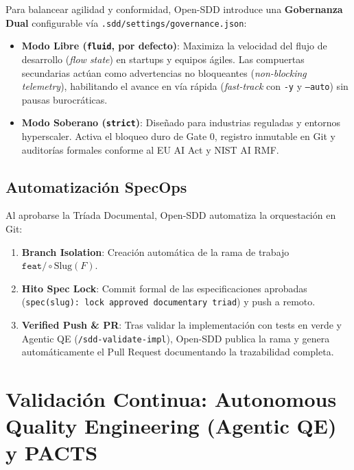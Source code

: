 \documentclass[11pt,a4paper]{article}
\begin{document}
Para balancear agilidad y conformidad, Open-SDD introduce una \textbf{Gobernanza Dual} configurable vía \texttt{.sdd/settings/governance.json}:
\begin{itemize}
    \item \textbf{Modo Libre (\texttt{fluid}, por defecto)}: Maximiza la velocidad del flujo de desarrollo (\textit{flow state}) en startups y equipos ágiles. Las compuertas secundarias actúan como advertencias no bloqueantes (\textit{non-blocking telemetry}), habilitando el avance en vía rápida (\textit{fast-track} con \texttt{-y} y \texttt{--auto}) sin pausas burocráticas.
    \item \textbf{Modo Soberano (\texttt{strict})}: Diseñado para industrias reguladas y entornos hyperscaler. Activa el bloqueo duro de Gate 0, registro inmutable en Git y auditorías formales conforme al EU AI Act y NIST AI RMF.
\end{itemize}

\subsection{Automatización SpecOps}
Al aprobarse la Tríada Documental, Open-SDD automatiza la orquestación en Git:
\begin{enumerate}
    \item \textbf{Branch Isolation}: Creación automática de la rama de trabajo $\texttt{feat/} \circ \text{Slug}(F)$.
    \item \textbf{Hito Spec Lock}: Commit formal de las especificaciones aprobadas (\texttt{spec(slug): lock approved documentary triad}) y push a remoto.
    \item \textbf{Verified Push \& PR}: Tras validar la implementación con tests en verde y Agentic QE (\texttt{/sdd-validate-impl}), Open-SDD publica la rama y genera automáticamente el Pull Request documentando la trazabilidad completa.
\end{enumerate}

\section{Validación Continua: Autonomous Quality Engineering (Agentic QE) y PACTS}
\end{document}
